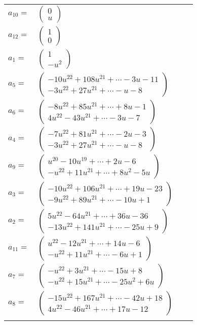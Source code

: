 \documentclass[1p]{elsarticle_modified}
\theoremstyle{definition}
\begin{document}
\begin{tabular}{m{7pt} m{180pt} m{7pt} m{180pt} }
\flushright $a_{10}=$&$\begin{pmatrix}0\\u\end{pmatrix}$ \\
\flushright $a_{12}=$&$\begin{pmatrix}1\\0\end{pmatrix}$ \\
\flushright $a_{1}=$&$\begin{pmatrix}1\\- u^2\end{pmatrix}$ \\
\flushright $a_{5}=$&$\begin{pmatrix}-10 u^{22}+108 u^{21}+\cdots-3 u-11\\-3 u^{22}+27 u^{21}+\cdots- u-8\end{pmatrix}$ \\
\flushright $a_{6}=$&$\begin{pmatrix}-8 u^{22}+85 u^{21}+\cdots+8 u-1\\4 u^{22}-43 u^{21}+\cdots-3 u-7\end{pmatrix}$ \\
\flushright $a_{4}=$&$\begin{pmatrix}-7 u^{22}+81 u^{21}+\cdots-2 u-3\\-3 u^{22}+27 u^{21}+\cdots- u-8\end{pmatrix}$ \\
\flushright $a_{9}=$&$\begin{pmatrix}u^{20}-10 u^{19}+\cdots+2 u-6\\- u^{22}+11 u^{21}+\cdots+8 u^2-5 u\end{pmatrix}$ \\
\flushright $a_{3}=$&$\begin{pmatrix}-10 u^{22}+106 u^{21}+\cdots+19 u-23\\-9 u^{22}+89 u^{21}+\cdots-10 u+1\end{pmatrix}$ \\
\flushright $a_{2}=$&$\begin{pmatrix}5 u^{22}-64 u^{21}+\cdots+36 u-36\\-13 u^{22}+141 u^{21}+\cdots-25 u+9\end{pmatrix}$ \\
\flushright $a_{11}=$&$\begin{pmatrix}u^{22}-12 u^{21}+\cdots+14 u-6\\- u^{22}+11 u^{21}+\cdots-6 u+1\end{pmatrix}$ \\
\flushright $a_{7}=$&$\begin{pmatrix}- u^{22}+3 u^{21}+\cdots-15 u+8\\- u^{22}+15 u^{21}+\cdots-25 u^2+6 u\end{pmatrix}$ \\
\flushright $a_{8}=$&$\begin{pmatrix}-15 u^{22}+167 u^{21}+\cdots-42 u+18\\4 u^{22}-46 u^{21}+\cdots+17 u-12\end{pmatrix}$\\&\end{tabular}
\end{document}
